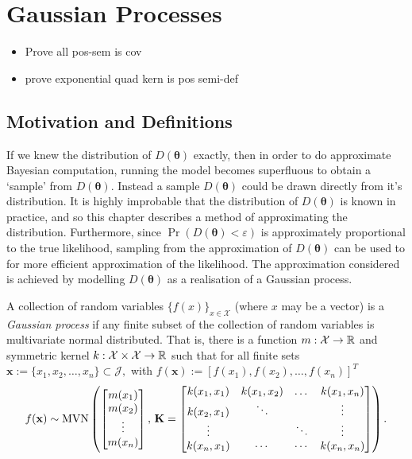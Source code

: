 \chapter{Gaussian Processes}

\begin{itemize}
    \item Prove all pos-sem is cov
    \item prove exponential quad kern is pos semi-def
\end{itemize}

\section{Motivation and Definitions}

If we knew the distribution of $D(\bm{\theta})$
exactly, then in order to do approximate
Bayesian computation, running the model becomes superfluous to
obtain a `sample' from $D(\bm{\theta})$. Instead a sample $D(\bm{\theta})$ 
could be drawn directly from it's distribution. It is highly improbable that
the distribution of $D(\bm{\theta})$ is known in practice, and so
this chapter describes a method of approximating the distribution. 
Furthermore, since $\Pr(D(\bm{\theta}) < \varepsilon)$
is approximately
proportional to the true likelihood, sampling from the approximation of 
$D(\bm{\theta})$ can be used to for more efficient approximation of 
the likelihood. The approximation considered is achieved by modelling
$D(\bm\theta)$ 
as a realisation of a Gaussian process.

\begin{definition}\label{def:gp}
    A collection of random variables $\{f(x)\}_{x\in\mathcal{X}}$
    (where $x$ may be a vector) is a \emph{Gaussian process} if any finite
    subset of the collection of random variables is multivariate normal
    distributed. That is, there is a function $m:\mathcal{X}\to\mathbb{R}$ and
    symmetric kernel $k:\mathcal{X}\times\mathcal{X}\to \mathbb{R}$ such that for all
    finite sets
    $\mathbf{x} :=\{x_1, x_2, \dots, x_n\} \subset \mathcal{J},$ with
    $f(\mathbf{x}) := [f(x_1), f(x_2), \dots, f(x_n)]^T$
    $$f(\mathbf{x}) \sim
        \operatorname{MVN}\left(\begin{bmatrix}
            m(x_1) \\ m(x_2)\\ \vdots\\ m(x_n)
        \end{bmatrix},\, \mathbf{K} = \begin{bmatrix}
            k(x_1, x_1) & k(x_1, x_2) & \dots  & k(x_1, x_n) \\
            k(x_2, x_1) & \ddots      &        & \vdots      \\
            \vdots      &             & \ddots & \vdots      \\
            k(x_n, x_1) & \cdots      & \cdots & k(x_n, x_n)
        \end{bmatrix}\right).$$
\end{definition}


